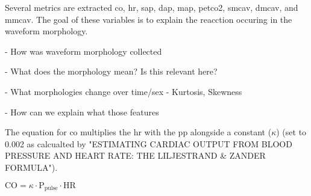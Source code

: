Several metrics are extracted \gls{co}, \gls{hr}, \gls{sap}, \gls{dap}, \gls{map}, \gls{petco2}, \gls{smcav}, \gls{dmcav}, and \gls{mmcav}. The goal of these variables is to explain the reacction occuring in the waveform morphology. 

- How was waveform morphology collected

- What does the morphology mean? Is this relevant here? 

- What morphologies change over time/sex
    - Kurtosis, Skewness

- How can we explain what those features


The equation for \gls{co} multiplies the \gls{hr} with the \gls{pp} alongside a constant ($\kappa$) (set to 0.002 as calcualted by "ESTIMATING CARDIAC OUTPUT FROM BLOOD PRESSURE AND HEART RATE: THE LILJESTRAND \& ZANDER FORMULA"). 

$\text{CO} = \kappa\cdot\text{P}_\text{pulse}\cdot\text{HR}$
